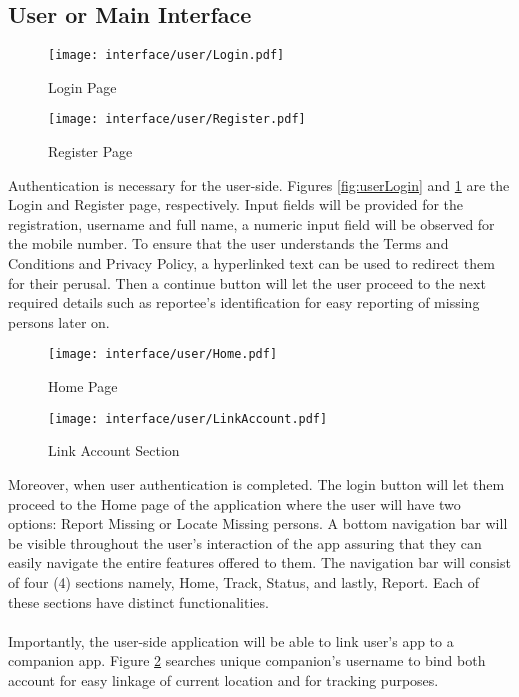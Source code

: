 \subsection{User or Main Interface}
\begin{figure}[!h]
    \centering
    \begin{minipage}[c]{0.50\linewidth}
        \centering
        \texttt{[image: interface/user/Login.pdf]}
        \caption{Login Page}
        \label{fig:userLogin}
    \end{minipage}\hfill
    \centering
    \begin{minipage}[c]{0.50\linewidth}
        \centering
        \texttt{[image: interface/user/Register.pdf]}
        \caption{Register Page}
        \label{fig:userRegister}
    \end{minipage}
\end{figure}
Authentication is necessary for the user-side. Figures \ref{fig:userLogin} and \ref{fig:userRegister} are the Login and Register page, respectively. Input fields will be provided for the registration, username and full name, a numeric input field will be observed for the mobile number. To ensure that the user understands the Terms and Conditions and Privacy Policy, a hyperlinked text can be used to redirect them for their perusal. Then a continue button will let the user proceed to the next required details such as reportee’s identification for easy reporting of missing persons later on.

\begin{figure}[!h]
    \centering
    \begin{minipage}[c]{0.50\linewidth}
        \centering
        \texttt{[image: interface/user/Home.pdf]}
        \caption{Home Page}
        \label{fig:userHome}
    \end{minipage}\hfill
    \centering
    \begin{minipage}[c]{0.50\linewidth}
        \centering
        \texttt{[image: interface/user/LinkAccount.pdf]}
        \caption{Link Account Section}
        \label{fig:userLink}
    \end{minipage}
\end{figure}
Moreover, when user authentication is completed. The login button will let them proceed to the Home page of the application where the user will have two options: Report Missing or Locate Missing persons. A bottom navigation bar will be visible throughout the user’s interaction of the app assuring that they can easily navigate the entire features offered to them. The navigation bar will consist of four (4) sections namely, Home, Track, Status, and lastly, Report. Each of these sections have distinct functionalities.
\\\\Importantly, the user-side application will be able to link user’s app to a companion app. Figure \ref{fig:userLink} searches unique companion’s username to bind both account for easy linkage of current location and for tracking purposes.

